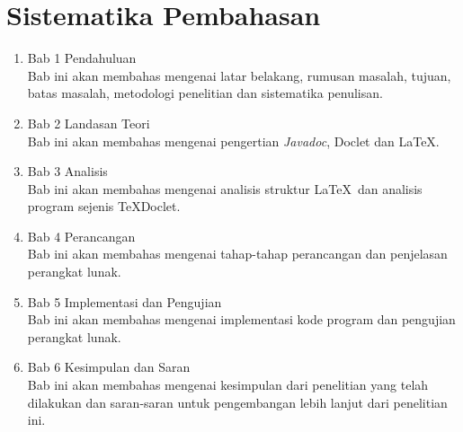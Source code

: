 \section{Sistematika Pembahasan}
\label{sec:sispem}
\begin{enumerate}
	\item Bab 1 Pendahuluan\\
	Bab ini akan membahas mengenai latar belakang, rumusan masalah, tujuan, batas masalah, metodologi penelitian dan sistematika penulisan.
	\item Bab 2 Landasan Teori\\
	Bab ini akan membahas mengenai pengertian {\it Javadoc}, Doclet dan \LaTeX.
	\item Bab 3 Analisis\\
	Bab ini akan membahas mengenai analisis struktur \LaTeX\ dan analisis program sejenis TeXDoclet.
	\item Bab 4 Perancangan\\
	Bab ini akan membahas mengenai tahap-tahap perancangan dan penjelasan perangkat lunak.
	\item Bab 5 Implementasi dan Pengujian\\
	Bab ini akan membahas mengenai implementasi kode program dan pengujian perangkat lunak.
	\item Bab 6 Kesimpulan dan Saran\\
	Bab ini akan membahas mengenai kesimpulan dari penelitian yang telah dilakukan dan saran-saran untuk pengembangan lebih lanjut dari penelitian ini.
\end{enumerate}
















